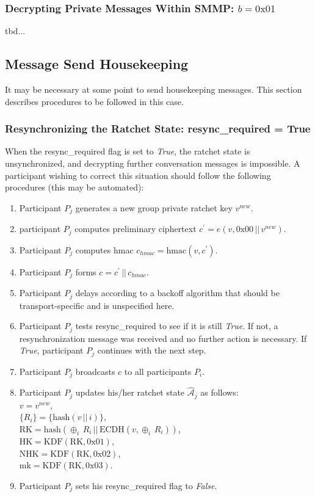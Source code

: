 \documentclass[%
preprint,
amsmath,amssymb,
aps,
prb,
floatfix,
]{revtex4-1}
\begin{document}
\subsubsection{\label{sec:imdecrypt}Decrypting Private Messages Within SMMP: $b =
0\mathrm{x}01$}

tbd...

\subsection{\label{sec:sendhousekeeping}Message Send Housekeeping}
It may be necessary at some point to send housekeeping messages. This section
describes procedures to be followed in this case.

\subsubsection{\label{sec:sendresync}Resynchronizing the Ratchet State:
resync\_required = True}
When the resync\_required flag is set to \textit{True}, the ratchet state is
unsynchronized, and decrypting further conversation messages is impossible.
A participant wishing to correct this situation should follow the following
procedures (this may be automated):
\begin{enumerate}
\item Participant $P_j$ generates a new group private ratchet key $v^{new}$.
\item participant $P_j$ computes preliminary ciphertext $c^\prime = e(v, 0\mathrm{x}00
\, || \, v^{new})$.
\item Participant $P_j$ computes hmac $c_{hmac} = \mathrm{hmac}(v, c^\prime)$.
\item Participant $P_j$ forms $c = c^\prime \, || \, c_{hmac}$.
\item Participant $P_j$ delays according to a backoff algorithm
that should be transport-specific and is unspecified here.
\item Participant $P_j$ tests resync\_required to see if it is still
\textit{True}. If not, a resynchronization message was received and no further
action is necessary. If \textit{True}, participant $P_j$ continues with the next
step.
\item Participant $P_j$ broadcasts $c$ to all participants $P_i$.
\item Participant $P_j$ updates his/her ratchet state
$\mathcal{\hat{A}}_j$ as follows:\\
$v = v^{new}$, \\
$\{R_i\} = \{ \mathrm{hash}(v \, || \, i)\}$, \\
$\mathrm{RK} = \mathrm{hash}(\oplus_i \, R_i \, || \, \mathrm{ECDH}(v, \oplus_i
\, R_i))$, \\
$\mathrm{HK} = \mathrm{KDF}(\mathrm{RK}, 0\mathrm{x}01)$, \\
$\mathrm{NHK} = \mathrm{KDF}(\mathrm{RK}, 0\mathrm{x}02)$, \\
$\mathrm{mk} = \mathrm{KDF}(\mathrm{RK}, 0\mathrm{x}03)$.
\item Participant $P_j$ sets his resync\_required flag to \textit{False}.
\end{enumerate}
\end{document}

